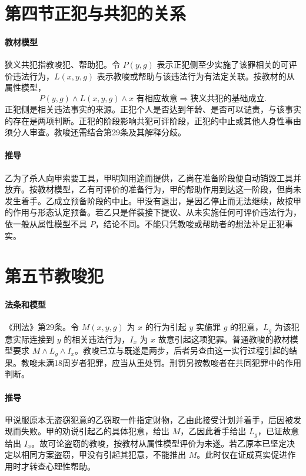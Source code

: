 \section{第四节\quad 正犯与共犯的关系}

\paragraph{教材模型}
狭义共犯指教唆犯、帮助犯。令 \(P(y,g)\) 表示正犯侧至少实施了该罪相关的可评价违法行为，\(L(x,y,g)\) 表示教唆或帮助与该违法行为有法定关联。按教材的从属性模型，
\[
P(y,g)\land L(x,y,g)\land\text{\(x\) 有相应故意}
\Longrightarrow \text{狭义共犯的基础成立}.
\]
正犯侧是相关违法事实的来源。正犯个人是否达到年龄、是否可以谴责，与该事实的存在是两项判断。正犯的阶段影响共犯可评阶段，正犯的中止或其他人身性事由须分人审查。教唆还需结合第29条及其解释分歧。

\paragraph{推导}
乙为了杀人向甲索要工具，甲明知用途而提供，乙尚在准备阶段便自动销毁工具并放弃。按教材模型，乙有可评价的准备行为，甲的帮助作用到达这一阶段，但尚未发生着手。乙成立预备阶段的中止。甲没有退出，是因乙停止而无法继续，故按甲的作用与形态认定预备。若乙只是佯装接下提议、从未实施任何可评价违法行为，依一般从属性模型不具 \(P\)，结论不同。不能只凭教唆或帮助者的想法补足正犯事实。

\section{第五节\quad 教唆犯}

\paragraph{法条和模型}
《刑法》第29条。令 \(M(x,y,g)\) 为 \(x\) 的行为引起 \(y\) 实施罪 \(g\) 的犯意，\(L_g\) 为该犯意实际连接到 \(y\) 的相关违法行为，\(I_x\) 为 \(x\) 故意引起这项犯罪。普通教唆的教材模型要求 \(M\land L_g\land I_x\)。教唆已立与既遂是两步，后者另查由这一实行过程引起的结果。教唆未满18周岁者犯罪，应当从重处罚。刑罚另按教唆者在共同犯罪中的作用判断。

\paragraph{推导}
甲说服原本无盗窃犯意的乙窃取一件指定财物，乙由此接受计划并着手，后因被发现而失败。甲的劝说引起乙的具体犯意，给出 \(M\)，乙因此着手给出 \(L_g\)，已证故意给出 \(I_x\)。故可论盗窃的教唆，按教材从属性模型评价为未遂。若乙原本已坚定决定以相同方案盗窃，甲没有引起其犯意，不能推出 \(M\)。此时仅在证成真实促进作用时才转查心理性帮助。


